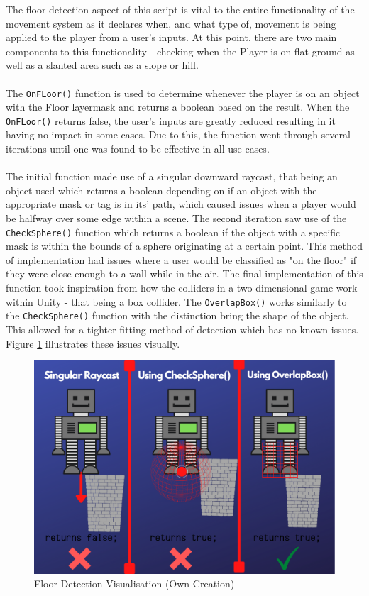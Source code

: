 \noindent The floor detection aspect of this script is vital to the entire functionality of the movement system as it declares when, and what type of, movement is being applied to the player from a user's inputs. At this point, there are two main components to this functionality - checking when the Player is on flat ground as well as a slanted area such as a slope or hill. 
\\\\
The \texttt{OnFLoor()} function is used to determine whenever the player is on an object with the Floor layermask and returns a boolean based on the result. When the \texttt{OnFLoor()} returns false, the user's inputs are greatly reduced resulting in it having no impact in some cases. Due to this, the function went through several iterations until one was found to be effective in all use cases. 
\\\\
The initial function made use of a singular downward raycast, that being an object used which returns a boolean depending on if an object with the appropriate mask or tag is in its' path, which caused issues when a player would be halfway over some edge within a scene. The second iteration saw use of the \texttt{CheckSphere()} function which returns a boolean if the object with a specific mask is within the bounds of a sphere originating at a certain point. This method of implementation had issues where a user would be classified as "on the floor" if they were close enough to a wall while in the air. The final implementation of this function took inspiration from how the colliders in a two dimensional game work within Unity - that being a box collider. The \texttt{OverlapBox()} works similarly to the \texttt{CheckSphere()} function with the distinction bring the shape of the object. This allowed for a tighter fitting method of detection which has no known issues. Figure \ref{floor} illustrates these issues visually. 

\begin{figure}[H]
\centering
\includegraphics[scale=0.665]{Figures/floor.png}
\caption{Floor Detection Visualisation (Own Creation)}
\label{floor}
\end{figure}

